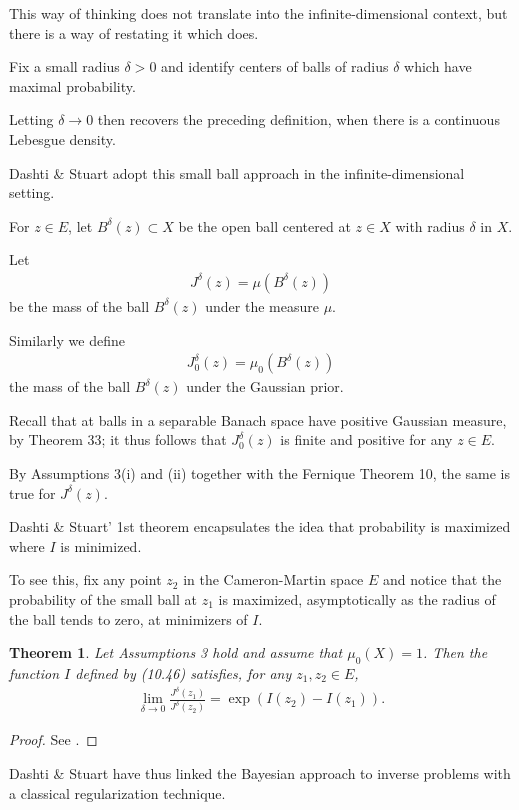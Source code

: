 \documentclass[oneside,11pt]{book}
\numberwithin{equation}{section}
\newtheorem{theorem}{Theorem}[section]
\begin{document}
This way of thinking does not translate into the infinite-dimensional context, but there is a way of restating it which does.

Fix a small radius $\delta > 0$ and identify centers of balls of radius $\delta$ which have maximal probability.

Letting $\delta\to 0$ then recovers the preceding definition, when there is a continuous Lebesgue density.

Dashti \& Stuart adopt this small ball approach in the infinite-dimensional setting.

%
For $z\in E$, let $B^\delta(z)\subset X$ be the open ball centered at $z\in X$ with radius $\delta$ in $X$.

Let
\begin{align*}
    J^\delta(z) = \mu(B^\delta(z))
\end{align*}
be the mass of the ball $B^\delta(z)$ under the measure $\mu$.

Similarly we define
\begin{align*}
    J_0^\delta(z) = \mu_0(B^\delta(z))
\end{align*}
the mass of the ball $B^\delta(z)$ under the Gaussian prior.

Recall that at balls in a separable Banach space have positive Gaussian measure, by Theorem 33; it thus follows that $J_0^\delta(z)$ is finite and positive for any $z\in E$.

By Assumptions 3(i) and (ii) together with the Fernique Theorem 10, the same is true for $J^\delta(z)$.

Dashti \& Stuart' 1st theorem encapsulates the idea that probability is maximized where $I$ is minimized.

To see this, fix any point $z_2$ in the Cameron-Martin space $E$ and notice that the probability of the small ball at $z_1$ is maximized, asymptotically as the radius of the ball tends to zero, at minimizers of $I$.

\begin{theorem}
    Let Assumptions 3 hold and assume that $\mu_0(X) = 1$. Then the function $I$ defined by (10.46) satisfies, for any $z_1,z_2\in E$,
    \begin{align*}
        \lim_{\delta\to 0} \frac{J^\delta(z_1)}{J^\delta(z_2)} = \exp(I(z_2) - I(z_1)).
    \end{align*}
\end{theorem}

\begin{proof}
    See \cite[pp. 360--361]{Dashti_Stuart2017}.
\end{proof}
Dashti \& Stuart have thus linked the Bayesian approach to inverse problems with a classical regularization technique.
\end{document}
